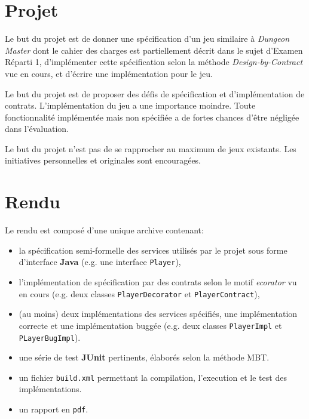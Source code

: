 \documentclass{article}
\begin{document}
\authors{}

\entete{}

\section*{Projet}

Le but du projet est de donner une spécification d'un jeu similaire à
\emph{Dungeon Master} dont le cahier des charges est partiellement
décrit dans le sujet d'Examen Réparti 1, d'implémenter cette
spécification selon la méthode \emph{Design-by-Contract} vue en cours,
et d'écrire une implémentation pour le jeu.

\noindent Le but du projet est de proposer des défis de spécification
et d'implémentation de contrats. L'implémentation du jeu a une
importance moindre. Toute fonctionnalité implémentée mais non
spécifiée a de fortes chances d'être négligée dans l'évaluation.

\noindent Le but du projet n'est pas de se rapprocher au maximum de
jeux existants. Les initiatives personnelles et originales sont
encouragées.

\section*{Rendu}

Le rendu est composé d'une unique archive contenant:
\begin{itemize}
\item la spécification semi-formelle des services utilisés par le
  projet sous forme d'interface \textbf{Java} (e.g. une interface
  \texttt{Player}),
\item l'implémentation de spécification par des contrats selon le
  motif \emph{ecorator} vu en cours (e.g. deux classes
  \texttt{PlayerDecorator} et \texttt{PlayerContract}),
\item (au moins) deux implémentations des services spécifiés, une
  implémentation correcte et une implémentation buggée (e.g. deux
  classes \texttt{PlayerImpl} et \texttt{PLayerBugImpl}).
\item une série de test \textbf{JUnit} pertinents, élaborés selon la
  méthode MBT.
\item un fichier \texttt{build.xml} permettant la compilation,
  l'execution et le test des implémentations.
\item un rapport en \texttt{pdf}.
\end{itemize}
\end{document}
